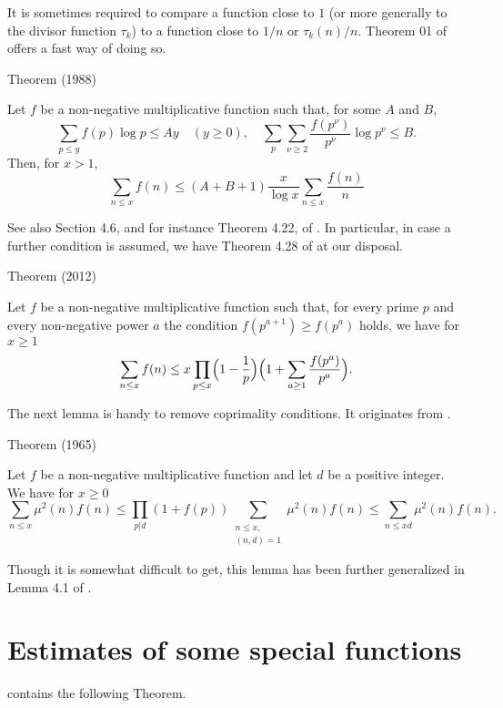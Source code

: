 It is sometimes required to compare a function close to $1$ (or more generally
to the divisor
function $\tau_k$) to a function 
close to $1/n$ or $\tau_k(n)/n$. Theorem 01 of 
\cite{Hall-Tenenbaum*88} offers a
fast way of doing so.
\par 
\begin{thm}{Theorem (1988)}

Let $f$ be a non-negative multiplicative function such that, for some $A$ and
$B$,
$$
\sum_{p\le y} f(p)\log p\le Ay \quad(y\ge 0),\quad
\sum_p\sum_{\nu\ge2} \frac{f(p^\nu)}{p^\nu}\log p^{\nu}\le B.
$$
Then, for $x > 1$,
$$
\sum_{n\le x}f(n)\le (A+B+1)\frac{x}{\log x}\sum_{n\le x}\frac{f(n)}{n}
$$
\end{thm}

See also Section 4.6, and for instance Theorem 4.22, of
\cite{Bordelles*12}.
In particular,
in case a further condition is assumed, we have Theorem 4.28 of
\cite{Bordelles*12}
at our disposal.
\par 
\begin{thm}{Theorem (2012)}

Let $f$ be a non-negative multiplicative function such that, for every
prime $p$ and every non-negative power $a$ the condition
$f(p^{a+1})\ge f(p^a)$ holds, we have
for $x \ge 1$
$$
\sum_{n\le x}f(n)\le x\prod_{p\le x}
\Bigl(1-\frac{1}{p}\Bigr)\Bigl(
1+\sum_{a\ge 1}\frac{f(p^a)}{p^a}\Bigr).
$$
\end{thm}

  
The next lemma is handy to remove coprimality conditions.
It originates from
\cite{van-Lint-Richert*65}.
\par 
\begin{thm}{Theorem (1965)}

Let $f$ be a non-negative multiplicative function and let $d$ be a
positive integer. We have
for $x \ge 0$
$$
\sum_{n\le x}\mu^2(n)f(n)\le \prod_{p|d}(1+f(p))
\sum_{\substack{n\le x,\\ (n,d)=1}}\mu^2(n)f(n)
\le
\sum_{n\le xd}\mu^2(n)f(n).
$$
\end{thm}

Though it is somewhat difficult to get, this lemma has been further generalized in Lemma 4.1 of
\cite{Ramare*10}.

\section{Estimates of some special functions}


\cite{Cohen-Dress*88} contains the
following Theorem.

